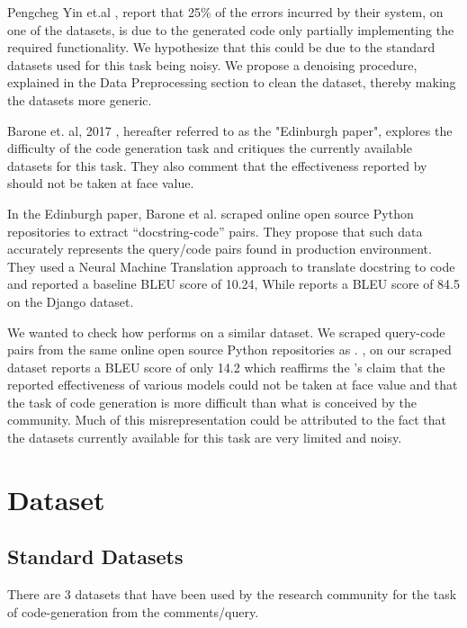 \documentclass{IEEEtran}
\begin{document}
    Pengcheg Yin et.al \cite{yin2017syntactic}, report that 25\% of the errors incurred
    by their system, on one of the datasets, is due to the generated
    code only partially implementing the required functionality.
    We hypothesize that this could be due to the standard datasets
    used for this task being noisy. We propose a denoising procedure,
    explained in the Data Preprocessing section to clean the dataset,
    thereby making the datasets more generic.

    Barone et. al, 2017 \cite{barone2017parallel}, hereafter referred to as the "Edinburgh paper",
    explores the difficulty of the code generation task and critiques
    the currently available datasets for this task. They also comment that
    the effectiveness reported by \cite{yin2017syntactic} should not be taken at face value.

    In the Edinburgh paper, Barone et al. scraped online open source Python
    repositories to extract ``docstring-code'' pairs. They propose that
    such data accurately represents the query/code pairs found in
    production environment. They used a Neural Machine Translation
    approach to translate docstring to code and reported a baseline
    BLEU score of 10.24, While \cite{yin2017syntactic} reports a BLEU score of 84.5 on the
    Django dataset.

    We wanted to check how \cite{yin2017syntactic} performs on a similar dataset.
    We scraped query-code pairs from the same online open source Python repositories as \cite{barone2017parallel}.
    \cite{yin2017syntactic}, on our scraped dataset reports a BLEU score of only 14.2 which reaffirms
    the \cite{barone2017parallel}'s claim that the reported effectiveness of various
    models could not be taken at face value and that the task of code generation
    is more difficult than what is conceived by the community.
    Much of this misrepresentation could be attributed to the fact that the
    datasets currently available for this task are very limited and noisy.

    \section{Dataset}
      \subsection{Standard Datasets}
        There are 3 datasets that have been used by the research community for the task
        of code-generation from the comments/query.
\end{document}
